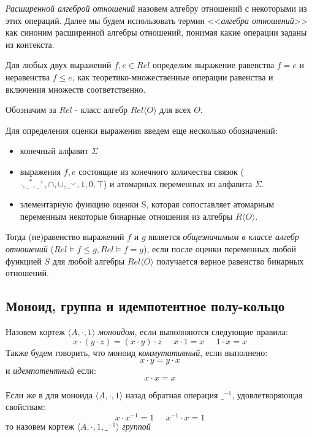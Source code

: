 \documentclass[times
              ]{itmo-student-thesis}
\begin{document}
      \textit{Расширенной алгеброй отношений} назовем алгебру отношений с некоторыми из этих операций. Далее мы будем использовать термин <<\textit{алгебра отношений}>> как синоним расширенной алгебры отношений, понимая какие операции заданы из контекста.


      Для любых двух выражений $ f, e \in \mathit{Rel}$ определим выражение равенства $ f = e $ и неравенства $ f \leq e $, как теоретико-множественные операции равенства и включения множеств соответственно.

      Обозначим за $\mathit{Rel}$ - класс алгебр $ \mathit{Rel}\langle O \rangle $ для всех $ O $.

      Для определения оценки выражения введем еще несколько обозначений:
      \begin{itemize}
        \item конечный алфавит $ \Sigma $
        \item выражения $ f, e $ состоящие из конечного количества связок
        ($ \cdot, \_^*, \_^+, \cap, \cup, \_^{\smile}, 1, 0, \top $) и атомарных переменных из алфавита $ \Sigma $.
        \item элементарную функцию оценки S, которая сопоставляет атомарным переменным некоторые бинарные отношения из алгебры $ R \langle O \rangle $.
      \end{itemize}
      Тогда (не)равенство выражений $ f $ и $ g $ является \textit{общезначимым в классе алгебр отношений}
      ($\mathit{Rel} \models f \leq g, \mathit{Rel} \models f = g $),
      если после оценки переменных любой функцией $ S $ для любой алгебры $ \mathit{Rel}\langle O \rangle $ получается верное равенство бинарных отношений.

    \subsection{Моноид, группа и идемпотентное полу-кольцо}
      Назовем кортеж $ \langle A, \cdot, 1 \rangle $ \textit{моноидом}, если выполняются следующие правила:
      $$ x \cdot (y \cdot z) = (x \cdot y) \cdot z \;\;\;\;\;
         x \cdot 1 = x \;\;\;\;\;
         1 \cdot x = x
      $$
      Также будем говорить, что моноид \textit{коммутативный}, если выполнено:
      $$ x \cdot y = y \cdot x $$
      и \textit{идемпотентный} если:
      $$ x \cdot x = x $$

      Если же в для моноида $ \langle A, \cdot, 1 \rangle $ назад обратная операция $ \_^{-1} $, удовлетворяющая свойствам:
      $$ x \cdot x^{-1} = 1 \;\;\;\;\;
         x^{-1} \cdot x = 1
      $$
      то назовем кортеж $ \langle A, \cdot, 1, \_^{-1}\rangle $ \textit{группой}
\end{document}
